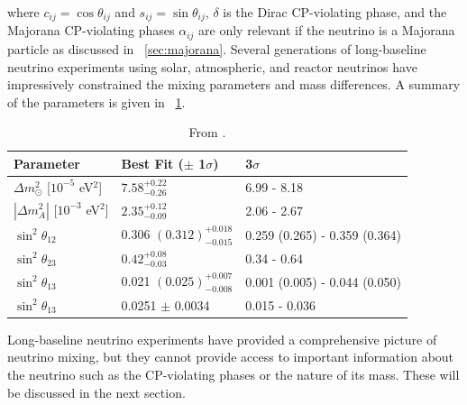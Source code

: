 where $c_{ij} = \cos{\theta_{ij}}$ and $s_{ij} = \sin{\theta_{ij}}$, $\delta$ is the Dirac CP-violating phase, and the Majorana CP-violating phases $\alpha_{ij}$ are only relevant if the neutrino is a Majorana particle as discussed in {\sect}~\ref{sec:majorana}.  Several generations of long-baseline neutrino experiments using solar, atmospheric, and reactor neutrinos have impressively constrained the mixing parameters and mass differences.  A summary of the parameters is given in {\tab}~\ref{tab:neutrinoParameters}.
\begin{table}
\centering
\begin{tabular}{lll}\toprule
Parameter & Best Fit ($\pm$ 1$\sigma$) & 3$\sigma$ \\
\midrule
${\Delta}m^2_{\odot}$ [$10^{-5}$ eV$^2$] & $7.58^{+0.22}_{-0.26}$ & 6.99 - 8.18 \\
$|{\Delta}m^2_A|$ [$10^{-3}$ eV$^2$] & $2.35^{+0.12}_{-0.09}$ & 2.06 - 2.67 \\
$\sin^2{\theta_{12}}$ & 0.306 $(0.312)^{+0.018}_{-0.015}$ & 0.259 (0.265) - 0.359 (0.364) \\  
$\sin^2{\theta_{23}}$ & $0.42^{+0.08}_{-0.03}$ & 0.34 - 0.64 \\  
$\sin^2{\theta_{13}}$ & 0.021 $(0.025)^{+0.007}_{-0.008}$ & 0.001 (0.005) - 0.044 (0.050) \\   
$\sin^2{\theta_{13}}$ & 0.0251 $\pm$ 0.0034 & 0.015 - 0.036 \\
\bottomrule  
\end{tabular}
\caption{From \cite{PDG}.}
\label{tab:neutrinoParameters}
\end{table}
Long-baseline neutrino experiments have provided a comprehensive picture of neutrino mixing, but they cannot provide access to important information about the neutrino such as the CP-violating phases or the nature of its mass.  These will be discussed in the next section.


